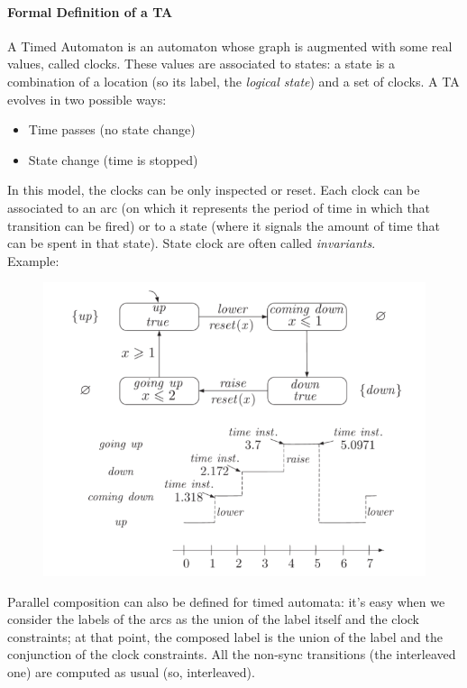 \documentclass{article}
\begin{document}
			\paragraph{Formal Definition of a TA}
				A Timed Automaton is an automaton whose graph is augmented with some real values, called clocks. These values are associated to states: a state is a combination of a location (so its label, the \emph{logical state}) and a set of clocks. A TA evolves in two possible ways:
				\begin{itemize}
					\item Time passes (no state change)
					\item State change (time is stopped)
				\end{itemize}
				In this model, the clocks can be only inspected or reset. Each clock can be associated to an arc (on which it represents the period of time in which that transition can be fired) or to a state (where it signals the amount of time that can be spent in that state). State clock are often called \emph{invariants}.\\
				Example:
				\begin{figure}[H]
					\centering
					\includegraphics[width = \textwidth]{./images/TA1.png}
				\end{figure}
				Parallel composition can also be defined for timed automata: it's easy when we consider the labels of the arcs as the union of the label itself and the clock constraints; at that point, the composed label is the union of the label and the conjunction of the clock constraints. All the non-sync transitions (the interleaved one) are computed as usual (so, interleaved).\\
\end{document}
